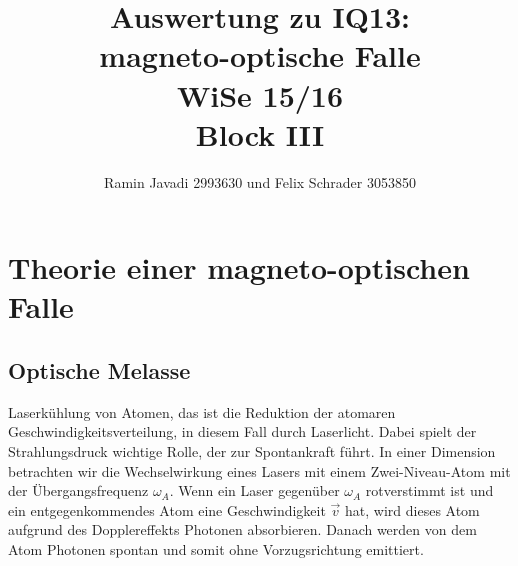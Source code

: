 \documentclass[12pt, a4paper]{article}
\title{Auswertung zu IQ13:\\
       magneto-optische Falle\\
       WiSe 15/16\\
       Block III}
\author{Ramin Javadi 2993630 und Felix Schrader 3053850}
\date{}
\begin{document}
\maketitle
\tableofcontents
\newpage
\section{Theorie einer magneto-optischen Falle}
  \subsection{Optische Melasse}
  Laserkühlung von Atomen, das ist die Reduktion der atomaren Geschwindigkeitsverteilung, in diesem Fall durch Laserlicht. Dabei spielt der Strahlungsdruck wichtige Rolle, der zur Spontankraft führt. In einer Dimension betrachten wir die Wechselwirkung eines Lasers mit einem Zwei-Niveau-Atom mit der Übergangsfrequenz ${\omega_A}$. Wenn ein Laser gegenüber ${\omega_A}$ rotverstimmt ist und ein entgegenkommendes Atom eine Geschwindigkeit ${\vec v}$ hat, wird dieses Atom aufgrund des Dopplereffekts Photonen absorbieren. Danach werden von dem Atom Photonen spontan und somit ohne Vorzugsrichtung emittiert.
  
\end{document}
